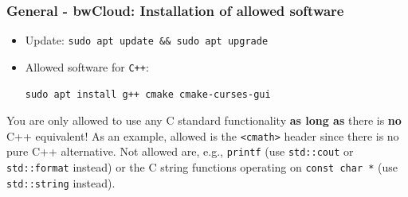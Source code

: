 \begin{frame}[fragile]
  \frametitle{General - bwCloud: Installation of allowed software}
    \begin{itemize}
        \item Update: \texttt{sudo apt update && sudo apt upgrade} \vspace{.5em}

        \item Allowed software for \texttt{C++}:\vspace*{-.2em}
        \begin{verbatim}
sudo apt install g++ cmake cmake-curses-gui
        \end{verbatim}

    \end{itemize}
    \vfill
    You are only allowed to use any C standard functionality \textbf{as long as} there is \textbf{no} C++ equivalent!
    As an example, allowed is the \texttt{<cmath>} header since there is no pure C++ alternative. 
    Not allowed are, e.g., \texttt{printf} (use \texttt{std::cout} or \texttt{std::format} instead) or the C string functions operating on \texttt{const char *} (use \texttt{std::string} instead). 
\end{frame}

